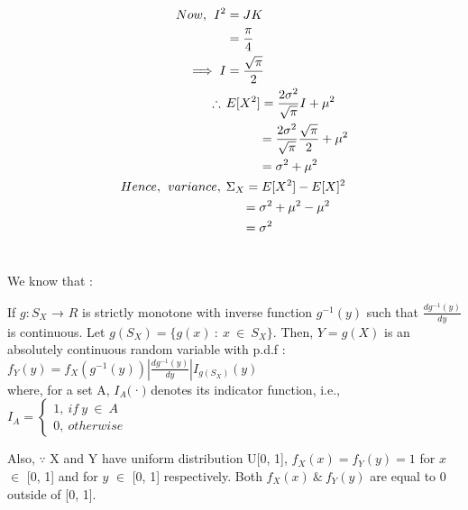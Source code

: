 \documentclass[a4paper,fleqn,11pt]{article}
\theoremstyle{mytheor}
\begin{document}
\begin{align*}
Now, \hspace{1ex} I^2 & = J K \\
& = \frac{\pi}{4} \\
\implies I & = \frac{\sqrt{\pi}}{2} \\
\therefore \hspace{1ex} & E[X^2] = \frac{2\sigma^2}{\sqrt{\pi}} I + \mu^2 \\
& \hspace{6ex} = \frac{2\sigma^2}{\sqrt{\pi}}\frac{\sqrt{\pi}}{2} + \mu^2  \\
& \hspace{6ex} = \sigma^2 + \mu^2 \\
Hence, \hspace{1ex} variance, \hspace{1ex} & \Sigma_{X} = E[X^2] - E[X]^2 \\
& \hspace{3ex} = \sigma^2 + \mu^2 - \mu^2 \\
& \hspace{3ex} = \sigma^2
\end{align*}
\section{}
We know that :
\begin{center}
If $g : S_X$ → $\!R$ is strictly monotone with inverse function $g^{-1} (y)$ such that $\frac{dg^{-1} (y)}{dy}$ is continuous. Let
$g(S_X) = \{g (x)\ :\ x\ \in\ S_X\}$. Then, $Y = g (X)$ is an absolutely continuous random variable with p.d.f : \\
$f_Y (y) = f_X (g^{-1}(y)) | \frac{dg^{-1}(y)}{dy} | I_{g(S_X)} (y)$ \\
where, for a set A, $I_A ($·$)$ denotes its indicator function, i.e.,
$I_A = \begin{cases}
		1,\ if\ y\ \in\ A \\
		0,\ otherwise
		\end{cases}$
\end{center}
Also, $\because$ X and Y have uniform distribution U[0, 1], $f_{X}(x) = f_{Y}(y) = 1$ for $x$ $\in$ [0, 1] and  for $y$ $\in$ [0, 1] respectively. Both $f_{X}(x)\ \&\ f_{Y}(y)$ are equal to 0 outside of [0, 1].
\end{document}
